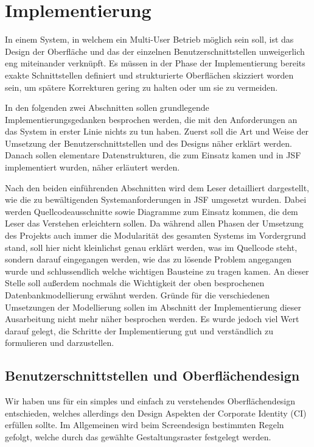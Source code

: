 \section{Implementierung}\label{sec:Implementierung}\label{secmin:Implementierung}

In einem System, in welchem ein \gls{Multi-User Betrieb} möglich sein soll, ist das Design der Oberfläche und das der einzelnen Benutzerschnittstellen unweigerlich eng miteinander verknüpft. 
Es müssen in der Phase der Implementierung bereits exakte Schnittstellen definiert und strukturierte Oberflächen skizziert worden sein, um spätere Korrekturen gering zu halten oder um sie zu vermeiden.

In den folgenden zwei Abschnitten sollen grundlegende Implementierungsgedanken besprochen werden, die mit den Anforderungen an das System in erster Linie nichts zu tun haben. 
Zuerst soll die Art und Weise der Umsetzung der Benutzerschnittstellen und des Designs näher erklärt werden. Danach sollen elementare Datenstrukturen, die zum Einsatz kamen und in JSF implementiert wurden, näher erläutert werden.

Nach den beiden einführenden Abschnitten wird dem Leser detailliert dargestellt, wie die zu bewältigenden Systemanforderungen in JSF umgesetzt wurden. 
Dabei werden Quellcodeausschnitte sowie Diagramme zum Einsatz kommen, die dem Leser das Verstehen erleichtern sollen.
Da während allen Phasen der Umsetzung des Projekts auch immer die Modularität des gesamten Systems im Vordergrund stand, soll hier nicht kleinlichst genau erklärt werden, was im Quellcode steht, sondern darauf eingegangen werden, wie das zu lösende Problem angegangen wurde und schlussendlich welche wichtigen Bausteine zu tragen kamen. 
An dieser Stelle soll außerdem nochmals die Wichtigkeit der oben besprochenen Datenbankmodellierung erwähnt werden. Gründe für die verschiedenen Umsetzungen der Modellierung sollen im Abschnitt der Implementierung dieser Ausarbeitung nicht mehr näher besprochen werden. 
Es wurde jedoch viel Wert darauf gelegt, die Schritte der Implementierung gut und verständlich zu formulieren und darzustellen.

\subsection{Benutzerschnittstellen und Oberflächendesign}

Wir haben uns für ein simples und einfach zu verstehendes Oberflächendesign entschieden, welches allerdings den Design Aspekten der \gls{Corporate Identity} (CI) erfüllen sollte. 
Im Allgemeinen wird beim Screendesign bestimmten Regeln gefolgt, welche durch das gewählte Gestaltungsraster festgelegt werden.

